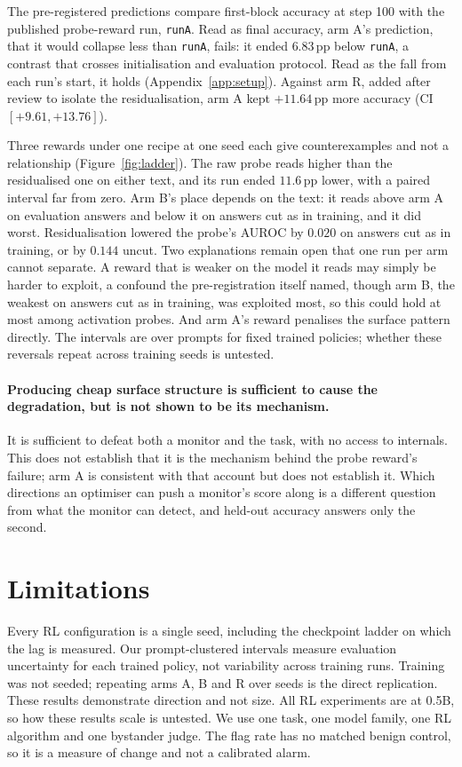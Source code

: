 \documentclass{article}
\begin{document}
The pre-registered predictions compare first-block accuracy at step 100 with the published probe-reward run, \texttt{runA}. Read as final accuracy, arm A's prediction, that it would collapse less than \texttt{runA}, fails: it ended $6.83$\,pp below \texttt{runA}, a contrast that crosses initialisation and evaluation protocol. Read as the fall from each run's start, it holds (Appendix~\ref{app:setup}). Against arm R, added after review to isolate the residualisation, arm A kept $+11.64$\,pp more accuracy (CI $[+9.61, +13.76]$).

Three rewards under one recipe at one seed each give counterexamples and not a relationship (Figure~\ref{fig:ladder}). The raw probe reads higher than the residualised one on either text, and its run ended $11.6$\,pp lower, with a paired interval far from zero. Arm B's place depends on the text: it reads above arm A on evaluation answers and below it on answers cut as in training, and it did worst. Residualisation lowered the probe's AUROC by $0.020$ on answers cut as in training, or by $0.144$ uncut. Two explanations remain open that one run per arm cannot separate. A reward that is weaker on the model it reads may simply be harder to exploit, a confound the pre-registration itself named, though arm B, the weakest on answers cut as in training, was exploited most, so this could hold at most among activation probes. And arm A's reward penalises the surface pattern directly. The intervals are over prompts for fixed trained policies; whether these reversals repeat across training seeds is untested.

\paragraph{Producing cheap surface structure is sufficient to cause the degradation, but is not shown to be its mechanism.} It is sufficient to defeat both a monitor and the task, with no access to internals. This does not establish that it is the mechanism behind the probe reward's failure; arm A is consistent with that account but does not establish it. Which directions an optimiser can push a monitor's score along is a different question from what the monitor can detect, and held-out accuracy answers only the second.

\section{Limitations}

Every RL configuration is a single seed, including the checkpoint ladder on which the lag is measured. Our prompt-clustered intervals measure evaluation uncertainty for each trained policy, not variability across training runs. Training was not seeded; repeating arms A, B and R over seeds is the direct replication. These results demonstrate direction and not size. All RL experiments are at 0.5B, so how these results scale is untested. We use one task, one model family, one RL algorithm and one bystander judge. The flag rate has no matched benign control, so it is a measure of change and not a calibrated alarm.
\end{document}
